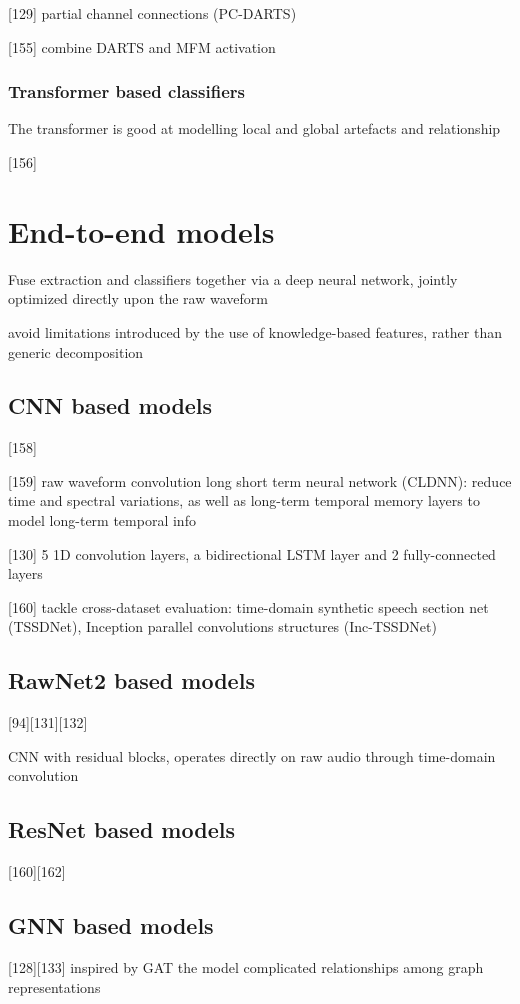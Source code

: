 \documentclass{article}
\begin{document}
[129] partial channel connections (PC-DARTS)

[155] combine DARTS and MFM activation

\subsubsection{Transformer based classifiers}
The transformer is good at modelling local and global artefacts and relationship

[156]

\section{End-to-end models}
Fuse extraction and classifiers together via a deep neural network, jointly optimized directly upon the raw waveform

avoid limitations introduced by the use of knowledge-based features, rather than generic decomposition

\subsection{CNN based models}
[158]

[159] raw waveform convolution long short term neural network (CLDNN): reduce time and spectral variations, as well as long-term temporal memory layers to model long-term temporal info

[130] 5 1D convolution layers, a bidirectional LSTM layer and 2 fully-connected layers

[160] tackle cross-dataset evaluation: time-domain synthetic speech section net (TSSDNet), Inception parallel convolutions structures (Inc-TSSDNet)

\subsection{RawNet2 based models}
[94][131][132]

CNN with residual blocks, operates directly on raw audio through time-domain convolution

\subsection{ResNet based models}
[160][162]

\subsection{GNN based models}
[128][133] inspired by GAT the model complicated relationships among graph representations
\end{document}
